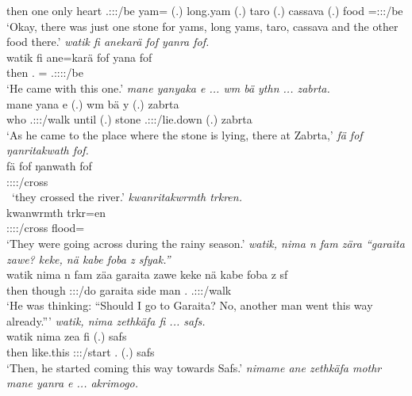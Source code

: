 \begin{exe}
	then one \Dem{} only heart \Tsg.\Masc:\Sbj:\Pst:\Ipfv/be yam=\Char{} (.) long.yam (.) taro (.) cassava (.) food \Indf{} \Med=\Stpl:\Sbj:\Nonpast:\Ipfv/be \Emph{}\\
	\trans `Okay, there was just one stone for yams, long yams, taro, cassava and the other food there.'
	\emph{watik fi anekarä fof yanra fof.}\\
	\gll watik fi ane=karä fof yana fof\\ 
	then \Third.\Abs{} \Dem=\Prop{} \Emph{} \Tsg.\Masc:\Sbj:\Pst:\Ipfv:\Venit/be \Emph\\
	\trans `He came with this one.'
	\emph{mane yanyaka e ... wm bä ythn ... zabrta.}\\
	\gll mane yana e (.) wm bä y (.) zabrta\\ 
	who \Tsg.\Masc:\Sbj:\Pst:\Ipfv/walk until (.) stone \Med{} \Tsg.\Masc:\Sbj:\Nonpast:\Ipfv/lie.down (.) zabrta\\
	\trans `As he came to the place where the stone is lying, there at Zabrta,'
	\emph{fä fof ŋanritakwath fof.}\\
	\gll fä fof ŋanwath fof\\ 
	\Dist{} \Emph{} \Stpl:\Sbj:\Pst:\Ipfv:\Venit/cross \Emph{}\\\
	\trans `they crossed the river.'
	\emph{kwanritakwrmth trkren.}\\
	\gll kwanwrmth trkr=en\\ 
	\Stpl:\Sbj:\Pst:\Dur:\Venit/cross flood=\Loc\\
	\trans `They were going across during the rainy season.'
	\emph{watik, nima n fam zära ``garaita zawe? keke, nä kabe foba z sfyak.''}\\
	\gll watik nima n fam zä\stem{r}a garaita zawe keke nä kabe foba z sf\\ 
	then \Quot{} \Imn{} though \Sg:\Sbj:\Pst:\Ipfv/do garaita side \Neg{} \Indf{} man \Dist.\Abl{} \Iam{} \Tsg.\Masc:\Sbj:\Pst:\Ipfv/walk\\
	\trans `He was thinking: ``Should I go to Garaita? No, another man went this way already.'''
\exi{104} 
	\emph{watik, nima zethkäfa fi ... safs.}\\
	\gll watik nima zea fi (.) safs\\ 
	then like.this \Sg:\Sbj:\Pst:\Pfv/start \Third.\Abs{} (.) safs\\
	\trans `Then, he started coming this way towards Safs.'
	\emph{nimame ane zethkäfa mothr mane yanra e ... akrimogo.}\\

\end{exe}
